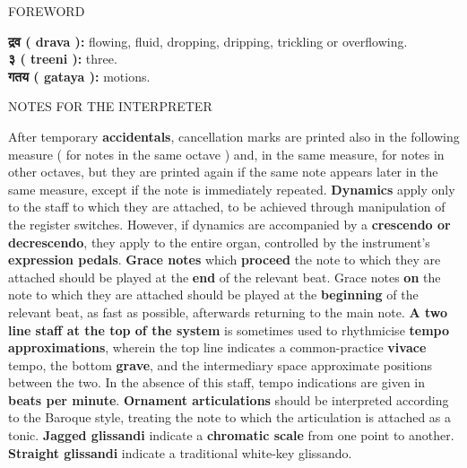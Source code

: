 \documentclass[12pt]{article}
\newcommand*\circled[1]{\tikz[baseline=(char.base)]{
            \node[shape=circle,draw,inner sep=1pt] (char) {#1};}}
\begin{document}
\vspace*{2\baselineskip}

\begingroup
\begin{center}
\huge FOREWORD
\end{center}
\endgroup

\begingroup
\begin{center}
\textbf{{\selectfont \setmainfont{Devanagari MT Bold}\selectfont द्रव} ( drava ):} flowing, fluid, dropping, dripping, trickling or overflowing. \\
\textbf{{\selectfont \setmainfont{Devanagari MT Bold}\selectfont ३} ( treeni ):} three. \\
\textbf{{\selectfont \setmainfont{Devanagari MT Bold}\selectfont गतय} ( gataya ):} motions. \\
\end{center}
\endgroup

\vspace*{4\baselineskip}

\begingroup
\begin{center}
\huge NOTES FOR THE INTERPRETER
\end{center}
\endgroup

\begingroup
\begin{center}
\textbf{\circled{1}} After temporary \textbf{accidentals}, cancellation marks are printed also in the following measure ( for notes in the same octave ) and, in the same measure, for notes in other octaves, but they are printed again if the same note appears later in the same measure, except if the note is immediately repeated. \textbf{\circled{2} Dynamics} apply only to the staff to which they are attached, to be achieved through manipulation of the register switches. However, if dynamics are accompanied by a \textbf{crescendo or decrescendo}, they apply to the entire organ, controlled by the instrument's \textbf{expression pedals}. \textbf{\circled{3} Grace notes} which \textbf{proceed} the note to which they are attached should be played at the \textbf{end} of the relevant beat. Grace notes \textbf{on} the note to which they are attached should be played at the \textbf{beginning} of the relevant beat, as fast as possible, afterwards returning to the main note. \textbf{\circled{4} A two line staff at the top of the system} is sometimes used to rhythmicise \textbf{tempo approximations}, wherein the top line indicates a common-practice \textbf{vivace} tempo, the bottom \textbf{grave}, and the intermediary space approximate positions between the two. In the absence of this staff, tempo indications are given in \textbf{beats per minute}. \textbf{\circled{5} Ornament articulations} should be interpreted according to the Baroque style, treating the note to which the articulation is attached as a tonic. \textbf{\circled{6} Jagged glissandi} indicate a \textbf{chromatic scale} from one point to another. \textbf{Straight glissandi} indicate a traditional white-key glissando.
\end{center}
\endgroup
\end{document}
